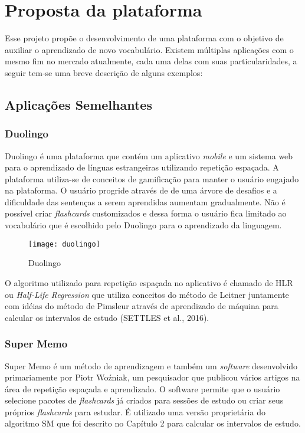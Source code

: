 \chapter{Proposta da plataforma}
Esse projeto propõe o desenvolvimento de uma plataforma com o objetivo de auxiliar o aprendizado de novo vocabulário. Existem múltiplas aplicações com o mesmo fim no mercado atualmente, cada uma delas com suas particularidades, a seguir tem-se uma breve descrição de alguns exemplos:

\section{Aplicações Semelhantes}

\subsection{Duolingo}
Duolingo é uma plataforma que contém um aplicativo \textit{mobile} e um sistema web para o aprendizado de línguas estrangeiras utilizando repetição espaçada. A plataforma utiliza-se de conceitos de gamificação para manter o usuário engajado na plataforma. O usuário progride através de de uma árvore de desafios e a dificuldade das sentenças a serem aprendidas aumentam gradualmente. Não é possível criar \textit{flashcards} customizados e dessa forma o usuário fica limitado ao vocabulário que é escolhido pelo Duolingo para o aprendizado da linguagem.

\begin{figure}[H]
\caption{\label{fig:duolingo}Duolingo}
\begin{center}
\texttt{[image: duolingo]}
\end{center}
\end{figure}

O algoritmo utilizado para repetição espaçada no aplicativo é chamado de HLR ou \textit{Half-Life Regression} que utiliza conceitos do método de Leitner juntamente com idéias do método de Pimsleur através de aprendizado de máquina para calcular os intervalos de estudo (SETTLES et al., 2016).

\subsection{Super Memo}
Super Memo é um método de aprendizagem e também um \textit{software} desenvolvido primariamente por Piotr Woźniak, um pesquisador que publicou vários artigos na área de repetição espaçada e aprendizado. O software permite que o usuário selecione pacotes de \textit{flashcards} já criados para sessões de estudo ou criar seus próprios \textit{flashcards} para estudar. É utilizado uma versão proprietária do algoritmo SM que foi descrito no Capítulo 2 para calcular os intervalos de estudo.

